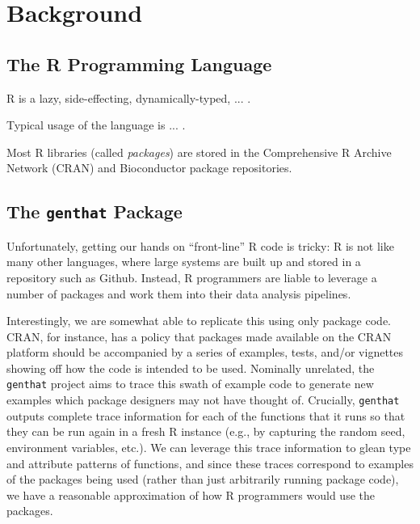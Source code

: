 \documentclass[acmsmall,10pt,review,anonymous]{acmart}\settopmatter{printfolios=true,printccs=false,printacmref=false}
\begin{document}
%
%
%
%
%
%
\section{Background}

%
%
%
%
\subsection{The R Programming Language}

R is a lazy, side-effecting, dynamically-typed, ... .

Typical usage of the language is ... . 

Most R libraries (called \textit{packages}) are stored in the Comprehensive R Archive Network (CRAN) and Bioconductor package repositories.


%
%
%
%
\subsection{The \texttt{genthat} Package}

Unfortunately, getting our hands on ``front-line'' R code is tricky:
R is not like many other languages, where large systems are built up and stored in a repository such as Github.
Instead, R programmers are liable to leverage a number of packages and work them into their data analysis pipelines.

Interestingly, we are somewhat able to replicate this using only package code.
CRAN, for instance, has a policy that packages made available on the CRAN platform should be accompanied by a series of examples, tests, and/or vignettes showing off how the code is intended to be used.
Nominally unrelated, the {\tt genthat} project aims to trace this swath of example code to generate new examples which package designers may not have thought of.
Crucially, {\tt genthat} outputs complete trace information for each of the functions that it runs so that they can be run again in a fresh R instance (e.g., by capturing the random seed, environment variables, etc.).
We can leverage this trace information to glean type and attribute patterns of functions, and since these traces correspond to examples of the packages being used (rather than just arbitrarily running package code), we have a reasonable approximation of how R programmers would use the packages.
\end{document}
